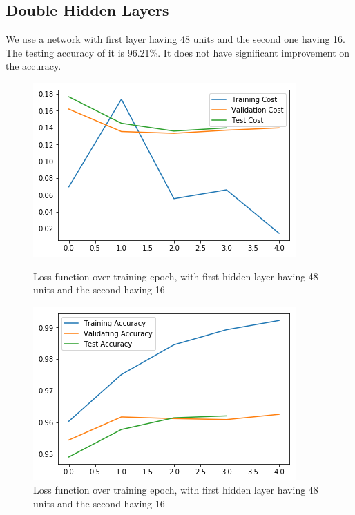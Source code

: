 \documentclass{article}
\begin{document}
\subsection{Double Hidden Layers}
We use a network with first layer having 48 units and the second one having 16. The testing accuracy of it is 96.21\%. It does not have significant improvement on the accuracy.
\begin{figure}[h]
	\begin{minipage}{0.48\textwidth}
	\centering
	\includegraphics[width=\textwidth]{pics/loss_double.png}
	\caption{Loss function over training epoch, with first hidden layer having 48 units and the second having 16}
	\end{minipage}\hfill
	\begin{minipage}{0.48\textwidth}
	\centering
	\includegraphics[width=\textwidth]{pics/acc_double.png}
	\caption{Loss function over training epoch, with first hidden layer having 48 units and the second having 16}
	\end{minipage}
\end{figure}
\end{document}
